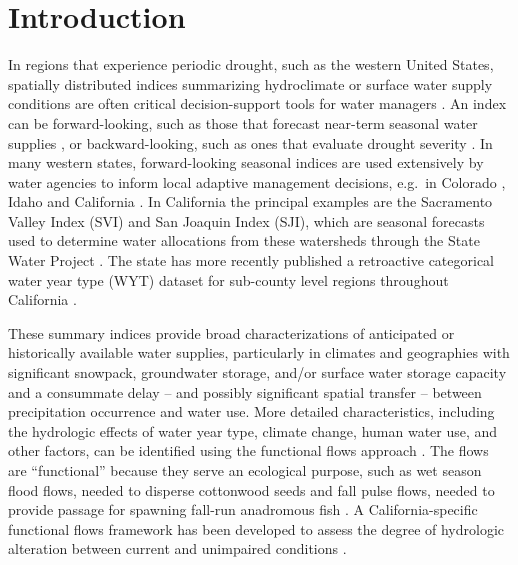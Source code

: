\documentclass[hess, manuscript]{copernicus}
\begin{document}
\section{Introduction}

In regions that experience periodic drought, such as the western United
States, spatially distributed indices summarizing hydroclimate or
surface water supply conditions are often critical decision-support
tools for water managers \citep[e.g.,][]{Garen1993}. An index can be
forward-looking, such as those that forecast near-term seasonal water
supplies \citep[e.g.,][]{Null2013, Verley2020}, or backward-looking,
such as ones that evaluate drought severity
\citep[e.g.,][]{Palmer1965, Guttman1998a, McKee1993, Wilhite1985, Wilhite2000}.
In many western states, forward-looking seasonal indices are used
extensively by water agencies to inform local adaptive management
decisions, e.g.~in Colorado \citeyearpar[CDWR][]{ColoradoDWR2023}, Idaho
\citeyearpar[NRCS][]{NRCS2023} and California \citep{Null2013}. In
California the principal examples are the Sacramento Valley Index (SVI)
and San Joaquin Index (SJI), which are seasonal forecasts used to
determine water allocations from these watersheds through the State
Water Project \citeyearpar[DWR][]{DWR2022}. The state has more recently
published a retroactive categorical water year type (WYT) dataset for
sub-county level regions throughout California
\citeyearpar[DWR][]{DWR2021a}.

These summary indices provide broad characterizations of anticipated or
historically available water supplies, particularly in climates and
geographies with significant snowpack, groundwater storage, and/or
surface water storage capacity and a consummate delay -- and possibly
significant spatial transfer -- between precipitation occurrence and
water use. More detailed characteristics, including the hydrologic
effects of water year type, climate change, human water use, and other
factors, can be identified using the functional flows approach
\citep[e.g.,][]{Poff1997, Bunn2002, Poff2010, Wheeler2018}. The flows
are ``functional'' because they serve an ecological purpose, such as wet
season flood flows, needed to disperse cottonwood seeds
\citep{Mahoney1998} and fall pulse flows, needed to provide passage for
spawning fall-run anadromous fish \citep{Moyle2002a}. A
California-specific functional flows framework has been developed to
assess the degree of hydrologic alteration between current and
unimpaired conditions \citep{Yarnell2020, Patterson2020}.
\end{document}
